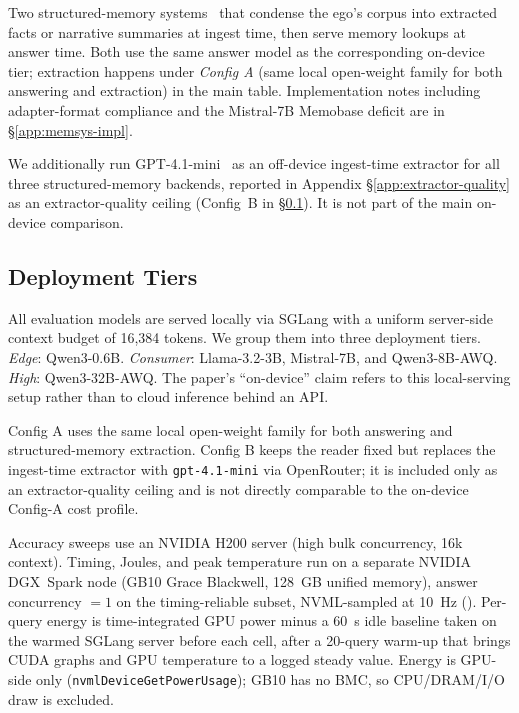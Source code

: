  Two structured-memory systems~\citep{memobase2025,memos2025} that condense the ego's corpus into extracted facts or narrative summaries at ingest time, then serve memory lookups at answer time. Both use the same answer model as the corresponding on-device tier; extraction happens under \emph{Config A} (same local open-weight family for both answering and extraction) in the main table. Implementation notes including adapter-format compliance and the Mistral-7B Memobase deficit are in \S\ref{app:memsys-impl}.

 We additionally run GPT-4.1-mini~\citep{openai2025gpt41mini} as an off-device ingest-time extractor for all three structured-memory backends, reported in Appendix \S\ref{app:extractor-quality} as an extractor-quality ceiling (Config~B in \S\ref{app:deployment-tiers}). It is not part of the main on-device comparison.

\subsection{Deployment Tiers}
\label{app:deployment-tiers}



All evaluation models are served locally via SGLang with a uniform server-side context budget of 16{,}384 tokens.
We group them into three deployment tiers.
\emph{Edge}: Qwen3-0.6B.
\emph{Consumer}: Llama-3.2-3B, Mistral-7B, and Qwen3-8B-AWQ.
\emph{High}: Qwen3-32B-AWQ.
The paper's ``on-device'' claim refers to this local-serving setup rather than to cloud inference behind an API.

Config A uses the same local open-weight family for both answering and structured-memory extraction.
Config B keeps the reader fixed but replaces the ingest-time extractor with \texttt{gpt-4.1-mini} via OpenRouter; it is included only as an extractor-quality ceiling and is not directly comparable to the on-device Config-A cost profile.

Accuracy sweeps use an NVIDIA H200 server (high bulk concurrency, 16k context).
Timing, Joules, and peak temperature run on a separate NVIDIA DGX~Spark node (GB10 Grace Blackwell, 128~GB unified memory), answer concurrency $=1$ on the timing-reliable subset, NVML-sampled at 10~Hz (). Per-query energy is time-integrated GPU power minus a 60~s idle baseline taken on the warmed SGLang server before each cell, after a 20-query warm-up that brings CUDA graphs and GPU temperature to a logged steady value. Energy is GPU-side only (\texttt{nvmlDeviceGetPowerUsage}); GB10 has no BMC, so CPU/DRAM/I/O draw is excluded. 

